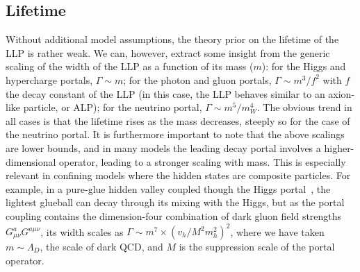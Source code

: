 \subsection{Lifetime}
\label{sec:darkshowerctau}

Without additional model assumptions, the theory prior on the lifetime of the LLP is rather weak. We can, however, extract some insight from the generic scaling of the width of the LLP as a function of its mass ($m$): for the Higgs and hypercharge portals, $\Gamma\sim m$; for the photon and gluon portals, $\Gamma\sim m^3/f^2$ with $f$ the decay constant of the LLP (in this case, the LLP behaves similar to an axion-like particle, or ALP); for the neutrino portal, $\Gamma \sim m^5/m_W^4$. The obvious trend in all cases is that the lifetime rises as the mass decreases, steeply so for the case of the neutrino portal. It is furthermore important to note that the above scalings are lower bounds, and in many models the leading decay portal involves a higher-dimensional operator, leading to a stronger scaling with mass. This is especially relevant in confining  models where the hidden states are composite particles. For example, in a pure-glue hidden valley coupled though the Higgs portal~\cite{Juknevich:2009gg}, the lightest glueball can decay through its mixing with the Higgs, but as the portal coupling contains the dimension-four combination of dark gluon field strengths $G^a_{\mu\nu}G^{a \mu\nu}$, its width scales as $\Gamma\sim m^7 \times (v_h/M^2 m_h^2)^2$, where we have taken $m\sim \Lambda_D$, the scale of dark QCD, and $M$ is the suppression scale of the portal operator.

